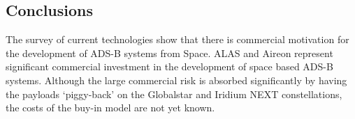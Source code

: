 \subsection{Conclusions}
The survey of current technologies show that there is commercial motivation for the development of ADS-B systems from Space.  ALAS and Aireon represent significant commercial investment in the development of space based ADS-B systems. Although the large commercial risk is absorbed significantly by having the payloads `piggy-back' on the Globalstar and Iridium NEXT constellations, the costs of the buy-in model are not yet known. 

